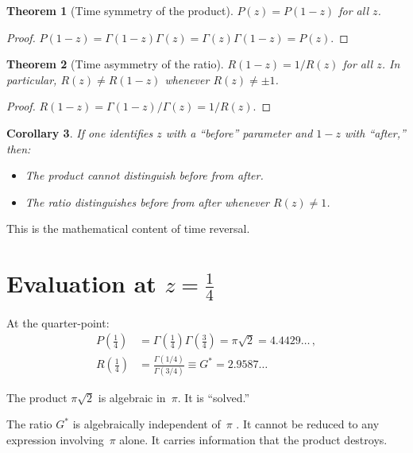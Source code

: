 \documentclass[12pt,reqno]{amsart}
\newtheorem{theorem}{Theorem}[section]
\newtheorem{corollary}[theorem]{Corollary}
\theoremstyle{definition}
\theoremstyle{remark}
\newcommand{\Gstar}{G^{\!*}}
\begin{document}
\begin{theorem}[Time symmetry of the product]\label{thm:product-sym}
$P(z) = P(1-z)$ for all $z$.
\end{theorem}

\begin{proof}
$P(1-z) = \Gamma(1-z)\Gamma(z) = \Gamma(z)\Gamma(1-z) = P(z)$.
\end{proof}

\begin{theorem}[Time asymmetry of the ratio]\label{thm:ratio-asym}
$R(1-z) = 1/R(z)$ for all $z$. In particular, $R(z) \neq R(1-z)$ whenever $R(z) \neq \pm 1$.
\end{theorem}

\begin{proof}
$R(1-z) = \Gamma(1-z)/\Gamma(z) = 1/R(z)$.
\end{proof}

\begin{corollary}
If one identifies $z$ with a ``before'' parameter and $1-z$ with ``after,'' then:
\begin{itemize}[nosep]
  \item The product cannot distinguish before from after.
  \item The ratio distinguishes before from after whenever $R(z) \neq 1$.
\end{itemize}
\end{corollary}

This is the mathematical content of time reversal.

\section{Evaluation at $z = \tfrac{1}{4}$}

At the quarter-point:
\begin{align}
  P\!\left(\tfrac{1}{4}\right) &= \Gamma\!\left(\tfrac{1}{4}\right)\Gamma\!\left(\tfrac{3}{4}\right) = \pi\sqrt{2} = 4.4429\ldots\,,\\[4pt]
  R\!\left(\tfrac{1}{4}\right) &= \frac{\Gamma(1/4)}{\Gamma(3/4)} \equiv \Gstar = 2.9587\ldots
\end{align}

The product $\pi\sqrt{2}$ is algebraic in~$\pi$. It is ``solved.''

The ratio $\Gstar$ is algebraically independent of~$\pi$ \cite{Nesterenko1996}. It cannot be reduced to any expression involving~$\pi$ alone. It carries information that the product destroys.
\end{document}
